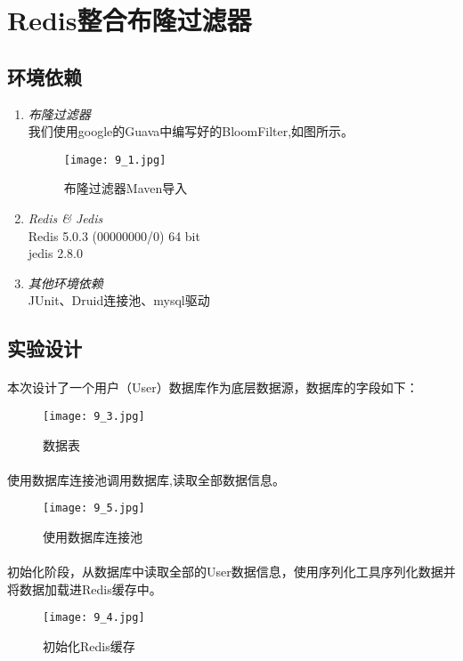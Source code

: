 \documentclass[lang=cn,11pt,a4paper,cite=numbers]{elegantpaper}
\begin{document}
\section{Redis整合布隆过滤器}
\subsection{环境依赖}
\begin{enumerate}[label=\arabic*).]
    \item \textit{布隆过滤器}\\
    我们使用google的Guava中编写好的BloomFilter,如图所示。
    \begin{figure}[!htb]
        \centering
        \texttt{[image: 9\_1.jpg]}
        \caption{布隆过滤器Maven导入}
    \end{figure}
        
    \item \textit{Redis \& Jedis}\\
    Redis 5.0.3 (00000000/0) 64 bit\\
    jedis 2.8.0
    \item \textit{其他环境依赖}\\
    JUnit、Druid连接池、mysql驱动
  \end{enumerate}
\subsection{实验设计}

\paragraph{}本次设计了一个用户（User）数据库作为底层数据源，数据库的字段如下：
\begin{figure}[!htb]
    \centering
    \texttt{[image: 9\_3.jpg]}
    \caption{数据表}
\end{figure}

\paragraph{}使用数据库连接池调用数据库,读取全部数据信息。
\begin{figure}[!htb]
    \centering
    \texttt{[image: 9\_5.jpg]}
    \caption{使用数据库连接池}
\end{figure}

\paragraph{}初始化阶段，从数据库中读取全部的User数据信息，使用序列化工具序列化数据并将数据加载进Redis缓存中。
\begin{figure}[!htb]
    \centering
    \texttt{[image: 9\_4.jpg]}
    \caption{初始化Redis缓存}
\end{figure}
\end{document}
